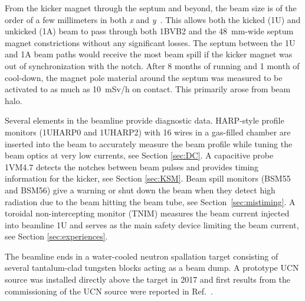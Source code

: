 \documentclass[aps,prab,twocolumn,superscriptaddress]{revtex4-1}
\begin{document}
From the kicker magnet through the septum and beyond, the beam size is of the order of a few millimeters in both {\it x} and {\it y}~\cite{bib:rwang}.  
This allows both the kicked (1U) and unkicked (1A) beam to pass through both 1BVB2 and the 48~mm-wide septum magnet constrictions without any significant losses.  The septum between the 1U and 1A beam paths would receive the most beam spill if the kicker magnet was out of synchronization with the notch. After 8 months of running and 1 month of cool-down, the magnet pole material around the septum was measured to be activated to as much as 10~mSv/h on contact. This primarily arose from beam halo.%

Several elements in the beamline provide diagnostic data. HARP-style profile monitors (1UHARP0 and 1UHARP2) with 16 wires in a gas-filled chamber are inserted into the beam to accurately measure the beam profile while tuning the beam optics at very low currents, see Section \ref{sec:DC}. A capacitive probe 1VM4.7 detects the notches between beam pulses and provides timing information for the kicker, see Section \ref{sec:KSM}. Beam spill monitors (BSM55 and BSM56) give a warning or shut down the beam when they detect high radiation due to the beam hitting the beam tube, see Section~\ref{sec:mistiming}. A toroidal non-intercepting monitor (TNIM) measures the beam current injected into beamline 1U and serves as the main safety device limiting the beam current, see Section \ref{sec:experiences}.

The beamline ends in a water-cooled neutron spallation target consisting of several tantalum-clad tungsten blocks acting as a beam dump. A prototype UCN source was installed directly above the target in 2017 and first results from the commissioning of the UCN source were reported in Ref.~\cite{UCNprod}.

\end{document}
